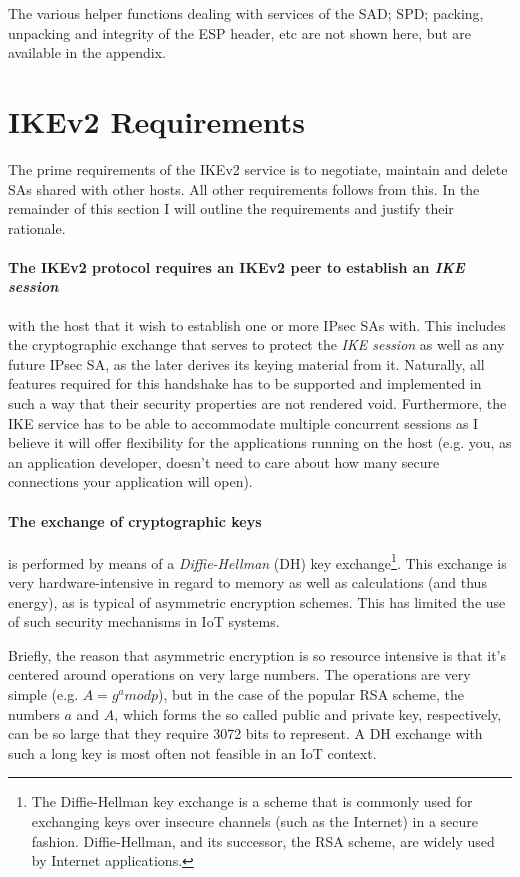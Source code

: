 \documentclass[final,a4paper,twoside,11pt,onecolumn]{report}
\begin{document}
The various helper functions dealing with services of the SAD; SPD; packing, unpacking and integrity of the ESP header, etc are not shown here, but are available in the appendix.



\section{IKEv2 Requirements}
The prime requirements of the IKEv2 service is to negotiate, maintain and delete SAs shared with other hosts. All other requirements follows from this. In the remainder of this section I will outline the requirements and justify their rationale.

\paragraph{The IKEv2 protocol requires an IKEv2 peer to establish an \emph{IKE session}} with the host that it wish to establish one or more IPsec SAs with. This includes the cryptographic exchange that serves to protect the \emph{IKE session} as well as any future IPsec SA, as the later derives its keying material from it. Naturally, all features required for this handshake has to be supported and implemented in such a way that their security properties are not rendered void. Furthermore, the IKE service has to be able to accommodate multiple concurrent sessions as I believe it will offer flexibility for the applications running on the host (e.g. you, as an application developer, doesn't need to care about how many secure connections your application will open).

\paragraph{The exchange of cryptographic keys} is performed by means of a \emph{Diffie-Hellman} (DH) key exchange\footnote{The Diffie-Hellman key exchange is a scheme that is commonly used for exchanging keys over insecure channels (such as the Internet) in a secure fashion. Diffie-Hellman, and its successor, the RSA scheme, are widely used by Internet applications.}. This exchange is very hardware-intensive in regard to memory as well as calculations (and thus energy), as is typical of asymmetric encryption schemes. This has limited the use of such security mechanisms in IoT systems.

Briefly, the reason that asymmetric encryption is so resource intensive is that it's centered around operations on very large numbers. The operations are very simple (e.g. $A = g^{a} mod p$), but in the case of the popular RSA scheme, the numbers $a$ and $A$, which forms the so called public and private key, respectively, can be so large that they require 3072 bits to represent. A DH exchange with such a long key is most often not feasible in an IoT context.
\end{document}
